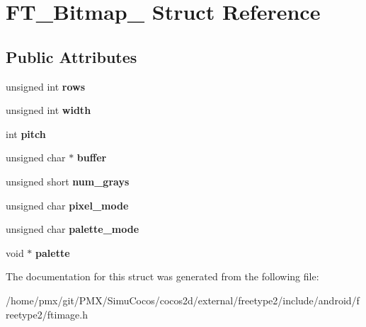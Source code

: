 \hypertarget{structFT__Bitmap__}{}\section{F\+T\+\_\+\+Bitmap\+\_\+ Struct Reference}
\label{structFT__Bitmap__}
\subsection*{Public Attributes}
\begin{DoxyCompactItemize}
\item 
\mbox{\label{structFT__Bitmap___ad857f33f4d12be88746072a7e1455270}} 
unsigned int {\bfseries rows}
\item 
\mbox{\label{structFT__Bitmap___a4a3dd62109eb0371f4ca8d196f713e4b}} 
unsigned int {\bfseries width}
\item 
\mbox{\label{structFT__Bitmap___afdee595846e1188c7a76d0cec9d85cf2}} 
int {\bfseries pitch}
\item 
\mbox{\label{structFT__Bitmap___a47edac6ed0bab48c0663cbaade8eed24}} 
unsigned char $\ast$ {\bfseries buffer}
\item 
\mbox{\label{structFT__Bitmap___a2465f41f8badacca572203c4bdb473e3}} 
unsigned short {\bfseries num\+\_\+grays}
\item 
\mbox{\label{structFT__Bitmap___a9bf1180f0b73c4161305ff0166f2652f}} 
unsigned char {\bfseries pixel\+\_\+mode}
\item 
\mbox{\label{structFT__Bitmap___a46b396401785e1cd90066f9cd11507f6}} 
unsigned char {\bfseries palette\+\_\+mode}
\item 
\mbox{\label{structFT__Bitmap___a9415e0c5b965c556858f0f856619c095}} 
void $\ast$ {\bfseries palette}
\end{DoxyCompactItemize}


The documentation for this struct was generated from the following file\+:\begin{DoxyCompactItemize}
\item 
/home/pmx/git/\+P\+M\+X/\+Simu\+Cocos/cocos2d/external/freetype2/include/android/freetype2/ftimage.\+h\end{DoxyCompactItemize}
